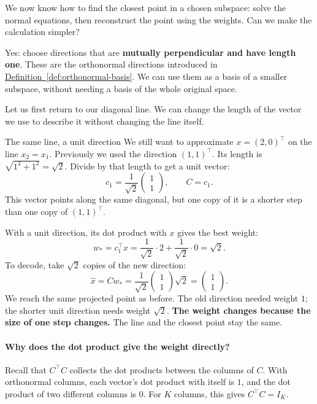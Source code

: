 \documentclass[a4paper,12pt,oneside]{report}
\begin{document}
We now know how to find the closest point in a chosen subspace:
solve the normal equations, then reconstruct the point using the
weights. Can we make the calculation simpler?

Yes: choose directions that are \textbf{mutually perpendicular and
have length one}. These are the orthonormal directions introduced
in \hyperref[def:orthonormal-basis]{Definition~\ref*{def:orthonormal-basis}}.
We can use them as a basis of a smaller subspace, without needing
a basis of the whole original space.

Let us first return to our diagonal line. We can change the length
of the vector we use to describe it without changing the line itself.

\begin{framedexample}{The same line, a unit direction}\label{ex:unit-diagonal}
We still want to approximate $x=(2,0)^\top$ on the line $x_2=x_1$.
Previously we used the direction $(1,1)^\top$.
Its length is $\sqrt{1^2+1^2}=\sqrt2$. Divide by that length to get
a unit vector:
\[
  c_1=\frac{1}{\sqrt2}\begin{pmatrix}1\\1\end{pmatrix},
  \qquad C=c_1.
\]
This vector points along the same diagonal, but one copy of it is
a shorter step than one copy of $(1,1)^\top$.

With a unit direction, its dot product with $x$ gives the best weight:
\[
  w_*=c_1^\top x
      =\frac{1}{\sqrt2}\cdot2+\frac{1}{\sqrt2}\cdot0
      =\sqrt2.
\]
To decode, take $\sqrt2$ copies of the new direction:
\[
  \hat{x}=Cw_*=
    \frac{1}{\sqrt2}\begin{pmatrix}1\\1\end{pmatrix}\sqrt2
    =\begin{pmatrix}1\\1\end{pmatrix}.
\]
We reach the same projected point as before. The old direction
needed weight $1$; the shorter unit direction needs weight $\sqrt2$.
\textbf{The weight changes because the size of one step changes.}
The line and the closest point stay the same.
\end{framedexample}

\paragraph{Why does the dot product give the weight directly?}
Recall that $C^\top C$ collects the dot products between the columns
of $C$. With orthonormal columns, each vector's dot product with
itself is $1$, and the dot product of two different columns is $0$.
For $K$ columns, this gives $C^\top C=I_K$.
\end{document}
